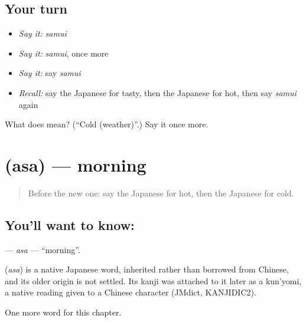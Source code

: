 \subsection*{Your turn}
\begin{itemize}
\raggedright
  \item \emph{Say it:} \emph{samui}
  \item \emph{Say it:} \emph{samui}, once more
  \item \emph{Say it:} say \emph{samui}
  \item \emph{Recall:} say the Japanese for tasty, then the Japanese for hot, then say \emph{samui} again
\end{itemize}

\begin{tcolorbox}[breakable,colback=teal!4,colframe=teal!35!black,title={Before you move on}]
What does  mean? (\textquotedblleft{}Cold (weather)\textquotedblright{}.) Say it once more.
\end{tcolorbox}
\section[\texorpdfstring{\ja{あさ} (asa)}{あさ (asa)}]{ (asa) — morning}

\label{lesson:JA-C53-asa}



\begin{quote}
Before the new one: say the Japanese for hot, then the Japanese for cold.
\end{quote}

\subsection*{You'll want to know: }
\textbf{} — \emph{asa} — \textquotedblleft{}morning\textquotedblright{}.

\begin{cousinweb}
\textbf{} (\emph{asa}) is a native Japanese word, inherited rather than borrowed from Chinese, and its older origin is not settled. Its kanji was attached to it later as a kun'yomi, a native reading given to a Chinese character (JMdict, KANJIDIC2).
\end{cousinweb}

\begin{grammarlens}[title={What you've built}]
One more word for this chapter.
\end{grammarlens}

